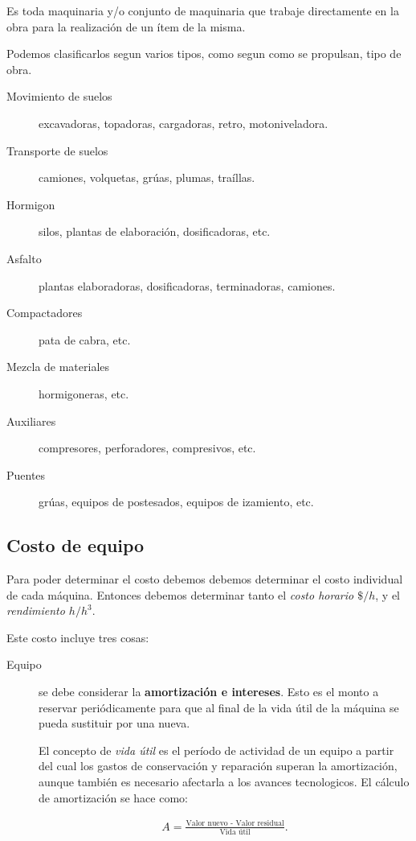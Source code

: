 \documentclass[../main.tex]{subfiles}
\begin{document}
Es toda maquinaria y/o conjunto de maquinaria que trabaje directamente en la
obra para la realización de un ítem de la misma.

Podemos clasificarlos segun varios tipos, como segun como se propulsan, tipo de
obra. 

\begin{description}
  \item[Movimiento de suelos] excavadoras, topadoras, cargadoras, retro, motoniveladora.
  \item[Transporte de suelos] camiones, volquetas, grúas, plumas, traíllas.
  \item[Hormigon] silos, plantas de elaboración, dosificadoras, etc.
  \item[Asfalto] plantas elaboradoras, dosificadoras, terminadoras, camiones.
  \item[Compactadores] pata de cabra, etc.
  \item[Mezcla de materiales] hormigoneras, etc.
  \item[Auxiliares] compresores, perforadores, compresivos, etc.
  \item[Puentes] grúas, equipos de postesados, equipos de izamiento, etc.
\end{description}

\subsection{Costo de equipo}

Para poder determinar el costo debemos debemos determinar el costo individual de
cada máquina. Entonces debemos determinar tanto el \textit{costo horario $\$/h$},
y el \textit{rendimiento $h/ h^3$}. 

Este costo incluye tres cosas:

\begin{description}
  \item[Equipo] se debe considerar la \textbf{amortización e intereses}. Esto es 
    el monto a reservar periódicamente para que al final de la vida útil de la 
    máquina se pueda sustituir por una nueva. 

    El concepto de \textit{vida útil} es el período de actividad de un equipo a 
    partir del cual los gastos de conservación y reparación superan la 
    amortización, aunque también es necesario afectarla a los avances tecnologicos.
    El cálculo de amortización se hace como:
    
    \begin{align*}
      A = \frac{\text{Valor nuevo - Valor residual}}{\text{Vida útil}}
    .\end{align*}
\end{description}
\end{document}

